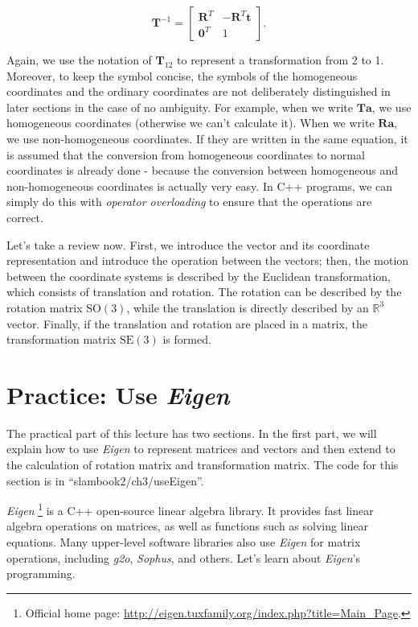 \begin{equation}
{ \mathbf{T}^{ - 1}} = \left[ {\begin{array}{*{20}{c}}
    {{\mathbf{R}^T}}&{ - {\mathbf{R}^T}\mathbf{t}}\\
    {{\mathbf{0}^T}}&1
    \end{array}} \right].
\end{equation}

Again, we use the notation of $ \mathbf{T}_{12} $ to represent a transformation from 2 to 1. Moreover, to keep the symbol concise, the symbols of the homogeneous coordinates and the ordinary coordinates are not deliberately distinguished in later sections in the case of no ambiguity. For example, when we write $ \mathbf {T} \mathbf{a} $, we use homogeneous coordinates (otherwise we can't calculate it). When we write $ \mathbf{Ra} $, we use non-homogeneous coordinates. If they are written in the same equation, it is assumed that the conversion from homogeneous coordinates to normal coordinates is already done - because the conversion between homogeneous and non-homogeneous coordinates is actually very easy. In C++ programs, we can simply do this with \textit{operator overloading} to ensure that the operations are correct.

Let's take a review now. First, we introduce the vector and its coordinate representation and introduce the operation between the vectors; then, the motion between the coordinate systems is described by the Euclidean transformation, which consists of translation and rotation. The rotation can be described by the rotation matrix $ \mathrm{SO}( 3 ) $, while the translation is directly described by an $ \mathbb{R}^ 3 $ vector. Finally, if the translation and rotation are placed in a matrix, the transformation matrix $ \mathrm{SE}( 3 ) $ is formed.

\section{Practice: Use \textit{Eigen}}
The practical part of this lecture has two sections. In the first part, we will explain how to use \textit{Eigen} to represent matrices and vectors and then extend to the calculation of rotation matrix and transformation matrix. The code for this section is in ``slambook2/ch3/useEigen''.

\textit{Eigen} \footnote{Official home page: \url{http://eigen.tuxfamily.org/index.php?title=Main_Page}. } is a C++ open-source linear algebra library. It provides fast linear algebra operations on matrices, as well as functions such as solving linear equations. Many upper-level software libraries also use \textit{Eigen} for matrix operations, including \textit{g2o}, \textit{Sophus}, and others. Let's learn about \textit{Eigen}'s programming.

